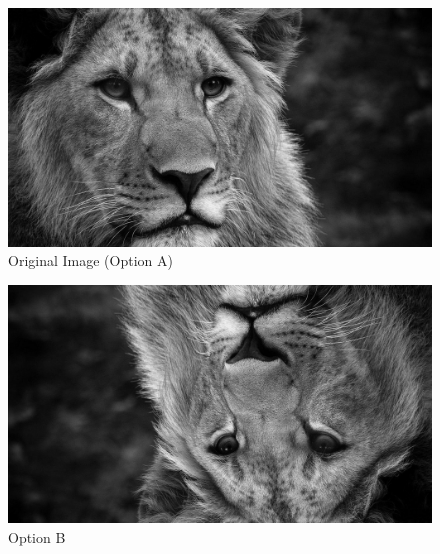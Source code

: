 \documentclass{ximera}
\begin{document}
\begin{exercise}
\begin{selectAll}
  \end{selectAll}

  
    \begin{figure}[h]
      \centering
        \includegraphics[width=.5\textwidth]{test_image.jpg}
        \caption{Original Image (Option A)}
        \label{fig:original}
    \end{figure}
  
      \begin{figure}[h]
        \centering
        \includegraphics[width=.5\textwidth]{test_image_rot_2.jpg}
        \caption{Option B}
        \label{fig:optionA}
    \end{figure}


\end{exercise}
\end{document}
